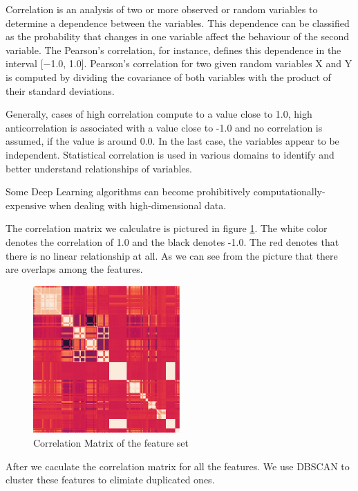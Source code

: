 \documentclass[5p]{elsarticle}
\begin{document}
Correlation is an analysis of two or more observed or random variables to determine a dependence between the variables. This dependence can be classified as the probability that changes in one variable affect the behaviour of the second variable. The Pearson’s correlation, for instance, defines this dependence in the interval [−1.0, 1.0]. Pearson’s correlation for two given random variables X and Y is computed by dividing the covariance of both variables with the product of their standard deviations.

Generally, cases of high correlation compute to a value close to 1.0, high anticorrelation is associated with a value close to -1.0 and no correlation is assumed, if the value is around 0.0. In the last case, the variables appear to be independent. Statistical correlation is used in various domains to identify and better understand relationships of variables.

Some Deep Learning algorithms can become prohibitively computationally-expensive when dealing with high-dimensional data.

The correlation matrix we calculatre is pictured in figure \ref{fig:Correlation_matrix}. The white color denotes the correlation of 1.0 and the black denotes -1.0. The red denotes that there is no linear relationship at all. As we can see from the picture that there are overlaps among the features. 

\begin{figure}[h]
    \centering
    \includegraphics[width=0.5\textwidth]{Correlation_Matrix.png}
    \caption{Correlation Matrix of the feature set}
    \label{fig:Correlation_matrix}
\end{figure}

After we caculate the correlation matrix for all the features. We use DBSCAN to cluster these features to elimiate duplicated ones.
\end{document}
